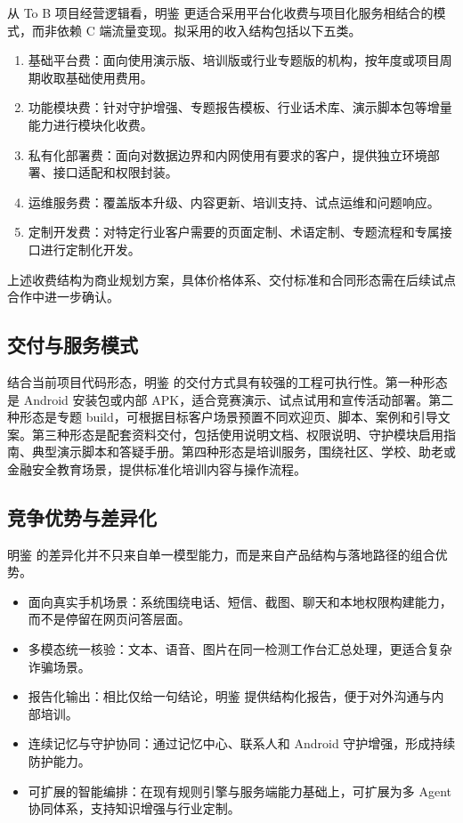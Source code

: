 \documentclass[UTF8,a4paper,12pt]{ctexart}
\begin{document}
从 To B 项目经营逻辑看，明鉴 更适合采用平台化收费与项目化服务相结合的模式，而非依赖 C 端流量变现。拟采用的收入结构包括以下五类。

\begin{enumerate}
    \item 基础平台费：面向使用演示版、培训版或行业专题版的机构，按年度或项目周期收取基础使用费用。
    \item 功能模块费：针对守护增强、专题报告模板、行业话术库、演示脚本包等增量能力进行模块化收费。
    \item 私有化部署费：面向对数据边界和内网使用有要求的客户，提供独立环境部署、接口适配和权限封装。
    \item 运维服务费：覆盖版本升级、内容更新、培训支持、试点运维和问题响应。
    \item 定制开发费：对特定行业客户需要的页面定制、术语定制、专题流程和专属接口进行定制化开发。
\end{enumerate}

上述收费结构为商业规划方案，具体价格体系、交付标准和合同形态需在后续试点合作中进一步确认。

\subsection{交付与服务模式}

结合当前项目代码形态，明鉴 的交付方式具有较强的工程可执行性。第一种形态是 Android 安装包或内部 APK，适合竞赛演示、试点试用和宣传活动部署。第二种形态是专题 build，可根据目标客户场景预置不同欢迎页、脚本、案例和引导文案。第三种形态是配套资料交付，包括使用说明文档、权限说明、守护模块启用指南、典型演示脚本和答疑手册。第四种形态是培训服务，围绕社区、学校、助老或金融安全教育场景，提供标准化培训内容与操作流程。

\subsection{竞争优势与差异化}

明鉴 的差异化并不只来自单一模型能力，而是来自产品结构与落地路径的组合优势。

\begin{itemize}
    \item 面向真实手机场景：系统围绕电话、短信、截图、聊天和本地权限构建能力，而不是停留在网页问答层面。
    \item 多模态统一核验：文本、语音、图片在同一检测工作台汇总处理，更适合复杂诈骗场景。
    \item 报告化输出：相比仅给一句结论，明鉴 提供结构化报告，便于对外沟通与内部培训。
    \item 连续记忆与守护协同：通过记忆中心、联系人和 Android 守护增强，形成持续防护能力。
    \item 可扩展的智能编排：在现有规则引擎与服务端能力基础上，可扩展为多 Agent 协同体系，支持知识增强与行业定制。
\end{itemize}
\end{document}
